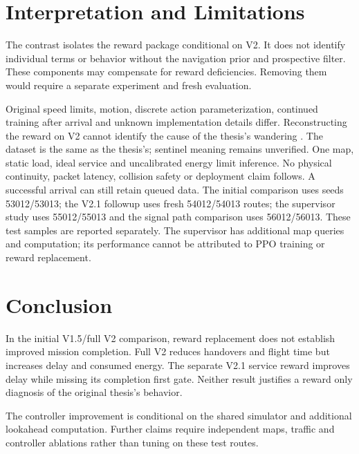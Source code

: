 

\clearpage
\onecolumn


\section{Interpretation and Limitations}
The contrast isolates the reward package conditional on V2. It does not identify
individual terms or behavior without the navigation prior and prospective
filter. These components may compensate for reward deficiencies. Removing them
would require a separate experiment and fresh evaluation.

Original speed limits, motion, discrete action parameterization, continued
training after arrival and unknown implementation details differ. Reconstructing
the reward on V2 cannot identify the cause of the thesis's wandering
\cite[p.~21, Sec.~8]{thesis}. The dataset is the same as the thesis's;
sentinel meaning remains unverified. One map, static load, ideal service and uncalibrated energy limit
inference. No physical continuity, packet latency, collision safety or deployment
claim follows. A successful arrival can still retain queued data. The initial
comparison uses seeds 53012/53013; the V2.1 followup uses fresh 54012/54013
routes; the supervisor study uses 55012/55013 and the signal path comparison
uses 56012/56013. These test samples are reported
separately. The supervisor has additional map queries and computation; its
performance cannot be attributed to PPO training or reward replacement.

\section{Conclusion}
In the initial V1.5/full V2 comparison, reward replacement does not establish
improved mission completion. Full V2 reduces handovers and flight time but
increases delay and consumed energy. The separate V2.1 service reward improves
delay while missing its completion first gate. Neither result justifies a
reward only diagnosis of the original thesis's behavior.


The controller improvement is conditional on the shared simulator and additional
lookahead computation. Further claims require independent maps, traffic and
controller ablations rather than tuning on these test routes.

\clearpage
\onecolumn\twocolumn
\appendices
